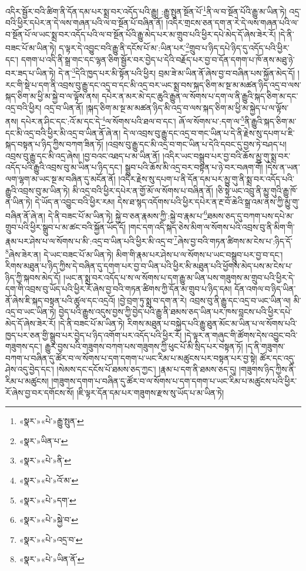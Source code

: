 འདིར་སྦྱོར་བའི་ཚིག་ནི་དོན་དམ་པར་སྨྲ་བར་འདོད་པའི་རྒྱུ། :རྒྱུ་སྤུན་སྔོན་པོ་\footnote{«སྣར་»«པེ་»རྒྱུ་སྤུན་}ནི་ལ་བ་སྔོན་པོའི་རྒྱུ་མ་ཡིན་ཏེ། འདྲ་བའི་ཕྱིར་དཔེར་ན་དེ་ལས་གཞན་པའི་ལ་བ་སྔོན་པོ་བཞིན་ནོ། །འདིར་གྲངས་ཅན་དག་ན་རེ་དེ་ལས་གཞན་པའི་ལ་བ་སྔོན་པོ་ལ་ཡང་སྨྲ་བར་འདོད་པའི་ལ་བ་སྔོན་པོའི་རྒྱུ་མེད་པར་མ་གྲུབ་པའི་ཕྱིར་དཔེ་མེད་དོ་ཞེས་ཟེར་རོ། །དེ་ནི་བཟང་པོ་མ་ཡིན་ཏེ། ད་ལྟར་དེ་འབྱུང་བའི་རྒྱུ་ནི་དངོས་པོ་མ་:ཡིན་པར་\footnote{«སྣར་»ཡིན་པ་}གྲུབ་པ་ཉིད་དཔེ་ཉིད་དུ་འདོད་པའི་ཕྱིར་དང་། དགག་པ་འདི་ནི་སྒྲ་གང་དང་ལྷན་ཅིག་སྦྱོར་བར་བྱེད་པ་དེའི་བརྗོད་པར་བྱ་བ་དོན་དགག་པ་ཁོ་ནས་མཐུ་ཉེ་བར་ཟད་པ་ཡིན་ཏེ། དེ་ན་\footnote{«སྣར་»«པེ་»ནི་}དེའི་ཁྱད་པར་མི་སྟོན་པའི་ཕྱིར། བྲམ་ཟེ་མ་ཡིན་ནོ་ཞེས་བྱ་བ་བཞིན་པས་སྐྱོན་མེད་དོ། །རང་གི་སྡེ་པ་དག་ནི་འབྲས་བུ་རྒྱུ་དང་འདྲ་བ་དང་མི་འདྲ་བར་ཡང་སྨྲ་བས་སྐད་ཅིག་མ་སྔ་མ་མཚན་ཉིད་འདྲ་བ་ལས་སྐད་ཅིག་མ་ཕྱི་མ་སྐྱེ་བ་ལ་ལྟོས་ནས། དཔེར་ན་མར་མེ་དང་ཆུའི་རྒྱུན་ལ་སོགས་པ་དག་ལ་ནི་རྒྱུའི་སྐད་ཅིག་མ་དང་འདྲ་བའི་ཕྱིར། འདྲ་བ་ཡིན་ནོ། །སྐད་ཅིག་མ་སྔ་མ་མཚན་ཉིད་མི་འདྲ་བ་ལས་སྐད་ཅིག་མ་ཕྱི་མ་སྐྱེད་པ་ལ་ལྟོས་ནས། དཔེར་ན་ཤིང་དང་:འོ་མ་དང་དེ་\footnote{«སྣར་»«པེ་»འོ་མ་}ལ་སོགས་པའི་ཐལ་བ་དང་། ཞོ་ལ་སོགས་པ་:དག་ལ་\footnote{«སྣར་»«པེ་»དག་}ནི་རྒྱུའི་སྐད་ཅིག་མ་དང་མི་འདྲ་བའི་ཕྱིར་མི་འདྲ་བ་ཡིན་ནོ་ཞེ་ན། དེ་ལ་འབྲས་བུ་རྒྱུ་དང་འདྲ་བ་གང་ཡིན་པ་དེ་ནི་རྗེས་སུ་དཔག་པ་ཇི་སྐད་བསྟན་པ་ཉིད་ཀྱིས་བཀག་ཟིན་ཏོ། །འབྲས་བུ་རྒྱུ་དང་མི་འདྲ་བ་གང་ཡིན་པ་དེའི་དབང་དུ་བྱས་ཏེ་བཤད་པ། འབྲས་བུ་རྒྱུ་དང་མི་འདྲ་ཞེས། །བྱ་བའང་འཐད་པ་མ་ཡིན་ནོ། །འདིར་ཡང་བསྒྲུབ་པར་བྱ་བའི་ཆོས་མྱུ་གུ་སྨྲ་བར་འདོད་པའི་རྒྱུའི་འབྲས་བུ་མ་ཡིན་པ་ཉིད་དང་། སྒྲུབ་པའི་ཆོས་མི་འདྲ་བར་བསྟན་པ་ཉེ་བར་བཞག་གོ། །དེས་ན་ཡན་ལག་ལྷག་མ་ཡང་སྔ་མ་བཞིན་དུ་མངོན་ནོ། །འདིར་རྗེས་སུ་དཔག་པ་ནི་དོན་དམ་པར་མྱུ་གུ་ནི་སྨྲ་བར་འདོད་པའི་རྒྱུའི་འབྲས་བུ་མ་ཡིན་ཏེ། མི་འདྲ་བའི་ཕྱིར་དཔེར་ན་གྱོ་མོ་ལ་སོགས་པ་བཞིན་ནོ། །ཅི་སྟེ་ཡང་འབྲུ་ནི་མྱུ་གུའི་རྒྱུ་ཁོ་ན་ཡིན་ཏེ། དེ་ཡོད་ན་འབྱུང་བའི་ཕྱིར་རམ། དེས་ཐ་སྙད་འདོགས་པའི་ཕྱིར་དཔེར་ན་རྔ་བོ་ཆེའི་སྒྲ་འམ་ནས་ཀྱི་མྱུ་གུ་བཞིན་ནོ་ཞེ་ན། དེ་ནི་བཟང་པོ་མ་ཡིན་ཏེ། སྐྱེ་བ་ཅན་རྣམས་ཀྱི་:སྐྱེ་བ་རྣམ་པ་\footnote{«སྣར་»«པེ་»སྐྱེ་བ་}ཐམས་ཅད་དུ་བཀག་པས་དཔེ་མ་གྲུབ་པའི་ཕྱིར་སྒྲུབ་པ་མ་ཚང་བའི་སྐྱོན་ཡོད་དོ། །གང་དག་འདི་སྐད་ཅེས་མིག་ལ་སོགས་པའི་འབྲས་བུ་ནི་མིག་གི་རྣམ་པར་ཤེས་པ་ལ་སོགས་པ་མི་:འདྲ་བ་ཡིན་པའི་ཕྱིར་མི་འདྲ་བ་\footnote{«སྣར་»«པེ་»འདྲ་བ་}ཞེས་བྱ་བའི་གཏན་ཚིགས་མ་ངེས་པ་:ཉིད་དོ་\footnote{«སྣར་»«པེ་»ཡིན་ནོ་}ཞེས་ཟེར་ན། དེ་ཡང་བཟང་པོ་མ་ཡིན་ཏེ། མིག་གི་རྣམ་པར་ཤེས་པ་ལ་སོགས་པ་ཡང་བསྒྲུབ་པར་བྱ་བ་དང་། རིགས་མཐུན་པ་ཉིད་ཀྱིས་དེ་བཞིན་དུ་དགག་པར་བྱ་བ་ཡིན་པའི་ཕྱིར་མི་མཐུན་པའི་ཕྱོགས་མེད་པས་མ་ངེས་པ་ཉིད་ཀྱི་སྐབས་མེད་དོ། །ཡང་ན་སྨྲ་བར་འདོད་པ་ས་ལ་སོགས་པ་དག་རྒྱུ་མ་ཡིན་པས་གཟུགས་མ་གྲུབ་པའི་ཕྱིར་དེ་དག་གི་འབྲས་བུ་ཡོད་པའི་ཕྱིར་རོ་ཞེས་བྱ་བའི་གཏན་ཚིགས་ཀྱི་དོན་མ་གྲུབ་པ་ཉིད་དམ། དོན་འགལ་བ་ཉིད་ཡིན་ནོ་ཞེས་ཇི་སྐད་བསྟན་པའི་ཚུལ་དང་འདྲའོ། །བྱེ་བྲག་ཏུ་སྨྲ་བ་དག་ན་རེ། འབྲས་བུ་ནི་རྒྱུ་དང་འདྲ་བ་ཡང་ཡིན་ལ། མི་འདྲ་བ་ཡང་ཡིན་ཏེ། བྱེད་པའི་རྒྱུས་འདུས་བྱས་ཀྱི་བྱེད་པའི་རྒྱུ་ནི་ཐམས་ཅད་ཡིན་པར་ཁས་བླངས་པའི་ཕྱིར་དཔེ་མེད་དོ་ཞེས་ཟེར་རོ། །དེ་ནི་བཟང་པོ་མ་ཡིན་ཏེ། རིགས་མཐུན་པ་བསྐྱེད་པའི་རྒྱུ་ཐུན་མོང་མ་ཡིན་པ་ལ་སོགས་པའི་ཁྱད་པར་ཅན་གྱི་སྒྲུབ་པར་བྱེད་པ་ཉིད་འགོག་པར་འདོད་པའི་ཕྱིར་རོ། །དེ་ལྟར་ན་གཞུང་གི་ཚོགས་དེས་འབྱུང་བའི་གཟུགས་དང་། རྒྱུར་བྱས་པའི་གཟུགས་བཀག་པས་གཟུགས་ཀྱི་ཕུང་པོ་མི་སྲིད་པར་བསྟན་ཏོ། །ད་ནི་གཟུགས་བཀག་པ་བཞིན་དུ་ཚོར་བ་ལ་སོགས་པ་དག་དགག་པ་ཡང་རིམ་པ་མཚུངས་པར་བསྟན་པར་བྱ་སྟེ། ཚོར་དང་འདུ་ཤེས་འདུ་བྱེད་དང་། །སེམས་དང་དངོས་པོ་ཐམས་ཅད་ཀྱང་། །རྣམ་པ་དག་ནི་ཐམས་ཅད་དུ། །གཟུགས་ཉིད་ཀྱིས་ནི་རིམ་པ་མཚུངས། །གཟུགས་དགག་པ་བཞིན་དུ་ཚོར་བ་ལ་སོགས་པ་དག་དགག་པ་ཡང་རིམ་པ་མཚུངས་པའི་ཕྱིར་རོ་ཞེས་བྱ་བར་དགོངས་སོ། །ཇི་ལྟར་དོན་དམ་པར་གཟུགས་རྫས་སུ་ཡོད་པ་མ་ཡིན་ཏེ། 